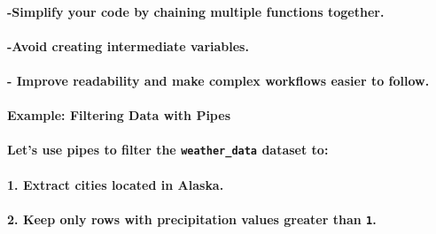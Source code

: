 \documentclass[
]{article}
\let\oldparagraph\paragraph
\renewcommand{\paragraph}[1]{\oldparagraph{#1}\mbox{}}
\begin{document}
\hypertarget{simplify-your-code-by-chaining-multiple-functions-together.}{%
\paragraph{-Simplify your code by chaining multiple functions
together.}\label{simplify-your-code-by-chaining-multiple-functions-together.}}

\hypertarget{avoid-creating-intermediate-variables.}{%
\paragraph{-Avoid creating intermediate
variables.}\label{avoid-creating-intermediate-variables.}}

\hypertarget{improve-readability-and-make-complex-workflows-easier-to-follow.}{%
\paragraph{- Improve readability and make complex workflows easier to
follow.}\label{improve-readability-and-make-complex-workflows-easier-to-follow.}}

\hypertarget{example-filtering-data-with-pipes}{%
\paragraph{Example: Filtering Data with
Pipes}\label{example-filtering-data-with-pipes}}

\hypertarget{lets-use-pipes-to-filter-the-weather_data-dataset-to}{%
\paragraph{\texorpdfstring{Let's use pipes to filter the
\texttt{weather\_data} dataset
to:}{Let's use pipes to filter the weather\_data dataset to:}}\label{lets-use-pipes-to-filter-the-weather_data-dataset-to}}

\hypertarget{extract-cities-located-in-alaska.}{%
\paragraph{\texorpdfstring{1. Extract cities located in
\textbf{Alaska}.}{1. Extract cities located in Alaska.}}\label{extract-cities-located-in-alaska.}}

\hypertarget{keep-only-rows-with-precipitation-values-greater-than-1.}{%
\paragraph{\texorpdfstring{2. Keep only rows with precipitation values
greater than
\texttt{1}.}{2. Keep only rows with precipitation values greater than 1.}}\label{keep-only-rows-with-precipitation-values-greater-than-1.}}
\end{document}
